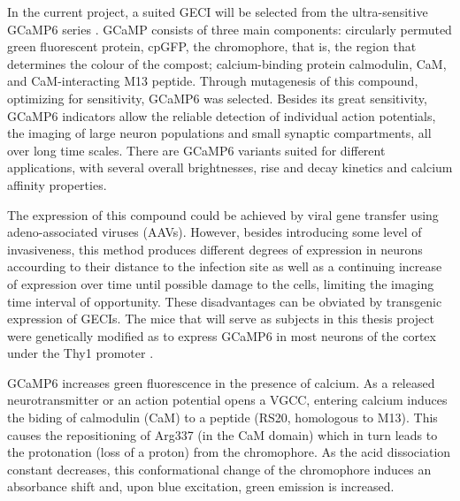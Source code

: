 In the current project, a suited GECI will be selected from the ultra-sensitive GCaMP6 series \cite{GCAMP6}. GCaMP consists of three main components: circularly permuted green fluorescent protein, cpGFP, the chromophore, that is, the region that determines the colour of the compost; calcium-binding protein calmodulin, CaM, and CaM-interacting M13 peptide. Through mutagenesis of this compound, optimizing for sensitivity, GCaMP6 was selected. Besides its great sensitivity, GCaMP6 indicators allow the reliable detection of individual action potentials, the imaging of large neuron populations and small synaptic compartments, all over long time scales. There are GCaMP6 variants suited for different applications, with several overall brightnesses, rise and decay kinetics and calcium affinity properties.

The expression of this compound could be achieved by viral gene transfer using adeno-associated viruses (AAVs). However, besides introducing some level of invasiveness, this method produces different degrees of expression in neurons accourding to their distance to the infection site as well as a continuing increase of expression over time until possible damage to the cells, limiting the imaging time interval of opportunity. These disadvantages can be obviated by transgenic expression of GECIs. The mice that will serve as subjects in this thesis project were genetically modified as to express GCaMP6 in most neurons of the cortex under the Thy1 promoter \cite{Transgenic}. 

GCaMP6 increases green fluorescence in the presence of calcium. As a released neurotransmitter or an action potential opens a VGCC, entering calcium induces the biding of calmodulin (CaM) to a peptide (RS20, homologous to M13). This causes the repositioning of Arg337 (in the CaM domain) which in turn leads to the protonation (loss of a proton) from the chromophore. As the acid dissociation constant decreases, %
this conformational change of the chromophore induces an absorbance shift and, upon blue excitation, green emission is increased.


